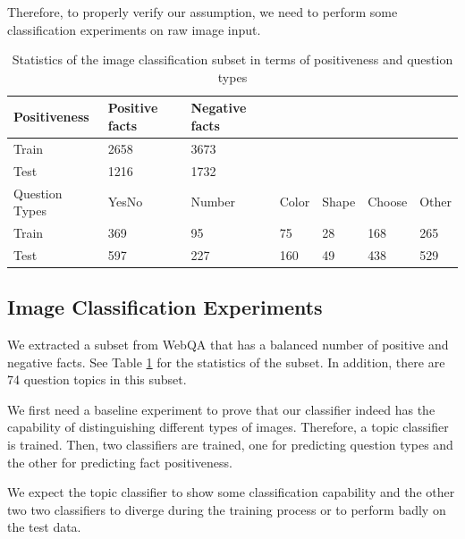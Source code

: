 \documentclass[nohyperref]{article}
\theoremstyle{plain}
\theoremstyle{definition}
\theoremstyle{remark}
\begin{document}
    Therefore, to properly verify our assumption, we need to perform some classification experiments on raw image input.

    \begin{table}[h]
        \centering
        \footnotesize
        \begin{tabular}{lllllll}
            Positiveness   & Positive facts & Negative facts &       &       &        &       \\
            \toprule
            Train          & 2658           & 3673           &       &       &        &       \\
            \midrule
            Test           & 1216           & 1732           &       &       &        &       \\
            \bottomrule
            Question Types & YesNo          & Number         & Color & Shape & Choose & Other \\
            \toprule
            Train          & 369            & 95             & 75    & 28    & 168    & 265   \\
            \midrule
            Test           & 597            & 227            & 160   & 49    & 438    & 529   \\
            \bottomrule
        \end{tabular}
        \caption{Statistics of the image classification subset in terms of positiveness and question types}
        \label{tab:image_classification_subset}
        \vspace{-5pt}
    \end{table}

    \subsection{Image Classification Experiments}

    We extracted a subset from WebQA that has a balanced number of positive and negative facts.
    See Table \ref{tab:image_classification_subset} for the statistics of the subset.
    In addition, there are 74 question topics in this subset.

    We first need a baseline experiment to prove that our classifier indeed has the capability of
    distinguishing different types of images.
    Therefore, a topic classifier is trained.
    Then, two classifiers are trained, one for predicting question types and the other for predicting fact positiveness.

    We expect the topic classifier to show some classification capability and
    the other two two classifiers to diverge during the training process or to perform badly on the test data.
\end{document}
